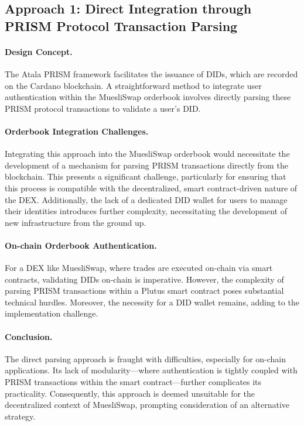 \documentclass[11pt]{article}
\begin{document}
\subsection{Approach 1: Direct Integration through PRISM Protocol Transaction Parsing}

\paragraph{Design Concept.} The Atala PRISM framework facilitates the issuance of DIDs, which are recorded on the Cardano blockchain. A straightforward method to integrate user authentication within the MuesliSwap orderbook involves directly parsing these PRISM protocol transactions to validate a user's DID.

\paragraph{Orderbook Integration Challenges.} Integrating this approach into the MuesliSwap orderbook would necessitate the development of a mechanism for parsing PRISM transactions directly from the blockchain. This presents a significant challenge, particularly for ensuring that this process is compatible with the decentralized, smart contract-driven nature of the DEX. Additionally, the lack of a dedicated DID wallet for users to manage their identities introduces further complexity, necessitating the development of new infrastructure from the ground up.

\paragraph{On-chain Orderbook Authentication.} For a DEX like MuesliSwap, where trades are executed on-chain via smart contracts, validating DIDs on-chain is imperative. However, the complexity of parsing PRISM transactions within a Plutus smart contract poses substantial technical hurdles. Moreover, the necessity for a DID wallet remains, adding to the implementation challenge.

\paragraph{Conclusion.} The direct parsing approach is fraught with difficulties, especially for on-chain applications. Its lack of modularity—where authentication is tightly coupled with PRISM transactions within the smart contract—further complicates its practicality. Consequently, this approach is deemed unsuitable for the decentralized context of MuesliSwap, prompting consideration of an alternative strategy.
\end{document}
